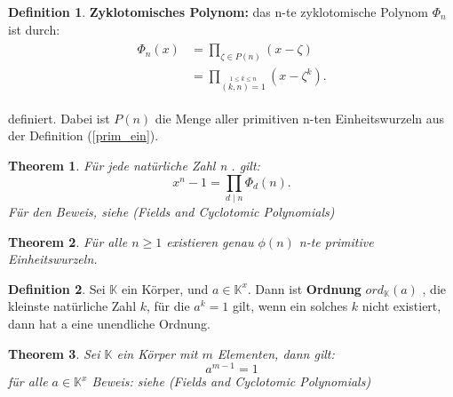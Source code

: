 \documentclass[12pt,oneside]{article}
\newtheorem{theorem}{Theorem}[section]
\theoremstyle{remark}
\theoremstyle{definition}
\newtheorem{definition}{Definition}[section]
\begin{document}
\begin{definition}\label{def_cyc_poly}
\textbf{Zyklotomisches Polynom:} das n-te zyklotomische Polynom $\Phi_{n}$ ist durch:\newline
\begin{equation}
    \begin{split}
        \begin{aligned}
            \Phi_{n}(x) &= \prod_{\zeta \in P(n)} (x -\zeta) \\
            &= \prod _{\stackrel {1\leq k\leq n}{(k,n)=1}}\left(x- \zeta^k\right).
        \end{aligned}
    \end{split}
\end{equation}

definiert. Dabei ist $P(n)$ die Menge aller primitiven n-ten Einheitswurzeln aus der Definition (\ref{prim_ein}). 
\end{definition}

\smallskip

\begin{theorem}\label{impor_cyc_lemma}
Für jede natürliche Zahl n . gilt:\newline
\begin{equation}
    x^n - 1 = \prod_{d \mid n} \Phi_{d}(n).
\end{equation}
Für den Beweis, siehe (Fields and Cyclotomic Polynomials) 
\end{theorem}

\smallskip

\begin{theorem}\label{num_of_prim_uni}
Für alle $n \geq 1$ existieren genau $\phi(n)$ n-te primitive Einheitswurzeln. 
\end{theorem}

\smallskip

\begin{definition}\label{ord_def}
Sei $\mathbb{K}$ ein Körper, und $a \in \mathbb{K}^x$. Dann ist \textbf{Ordnung} $ ord_{ \mathbb{K} }(a)$ , die kleinste natürliche Zahl $k$, für die $a^k = 1 $ gilt, wenn ein solches $k$ nicht existiert, dann hat a eine unendliche Ordnung. 
\end{definition}

\smallskip

\begin{theorem}
Sei $\mathbb{K}$ ein Körper mit $m$ Elementen, dann gilt:
\begin{equation}
    a^{m-1} = 1
\end{equation}
für alle $a \in \mathbb{K}^x$\newline
Beweis: siehe (Fields and Cyclotomic Polynomials) 
\end{theorem}
\end{document}
